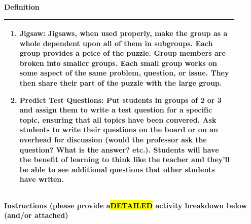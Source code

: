\documentclass{article}
\begin{document}
{\large\textbf{Definition}}\\
\noindent
\begin{tabular}{|p{0.9\linewidth}|}
\hline
\begin{enumerate}
    \item\textbf{Jigsaw:} Jigsaws, when used properly, make the group as a whole dependent upon all of them in subgroups. Each group provides a peice of the puzzle. Group members are broken into smaller groups. Each small group works on some aspect of the same problem, question, or issue. They then share their part of the puzzle with the large group.
    \item\textbf{Predict Test Questions:}  Put students in groups of 2 or 3 and assign them to write a test question for a specific topic, ensuring that all topics have been convered. Ask students to write their questions on the board or on an overhead for discussion (would the professor ask the question? What is the answer? etc.). Students will have the benefit of learning to think like the teacher and they'll be able to see additional questions that other students have writen.
 
\end{enumerate} \\
\hline
\end{tabular}
\vspace{0.2cm}
\newpage
{\large\textbf{Instructions (please provide a\hl{DETAILED} activity breakdown below (and/or attached)}}\\
\noindent
\end{document}
